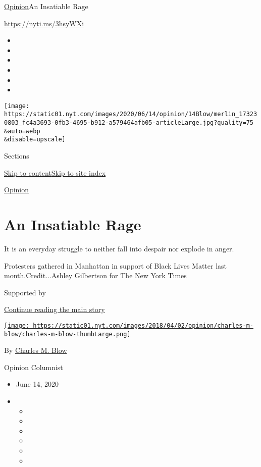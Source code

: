 \href{/section/opinion}{Opinion}\textbar{}An Insatiable Rage

\url{https://nyti.ms/3hsyWXi}

\begin{itemize}
\item
\item
\item
\item
\item
\item
\end{itemize}

\texttt{[image: https://static01.nyt.com/images/2020/06/14/opinion/14Blow/merlin\_173230803\_fc4a3693-0fb3-4695-b912-a579464afb05-articleLarge.jpg?quality=75\\\&auto=webp\\\&disable=upscale]}

Sections

\protect\hyperlink{site-content}{Skip to
content}\protect\hyperlink{site-index}{Skip to site index}

\href{/section/opinion}{Opinion}

\hypertarget{an-insatiable-rage}{%
\section{An Insatiable Rage}\label{an-insatiable-rage}}

It is an everyday struggle to neither fall into despair nor explode in
anger.

Protesters gathered in Manhattan in support of Black Lives Matter last
month.Credit...Ashley Gilbertson for The New York Times

Supported by

\protect\hyperlink{after-sponsor}{Continue reading the main story}

\href{https://www.nytimes.com/by/charles-m-blow}{\texttt{[image: https://static01.nyt.com/images/2018/04/02/opinion/charles-m-blow/charles-m-blow-thumbLarge.png]}}

By \href{https://www.nytimes.com/by/charles-m-blow}{Charles M. Blow}

Opinion Columnist

\begin{itemize}
\item
  June 14, 2020
\item
  \begin{itemize}
  \item
  \item
  \item
  \item
  \item
  \item
  \end{itemize}
\end{itemize}

